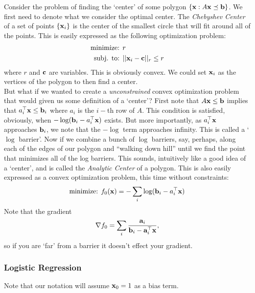 \documentclass{article}
\begin{document}
Consider the problem of finding the `center' of some
polygon $\{{\bf x} : A{\bf x} \preceq {\bf b}\}$. We first need to denote
what we consider the optimal center. The \textit{Chebyshev Center}
of a set of points $\{{\bf x}_i\}$ is the center of the smallest
circle that will fit around all of the points. This is easily
expressed as the following optimization problem:
\begin{align*}
    \text{minimize: } & r\\
    \text{subj. to: } & ||{\bf x}_i - {\bf c}||_r \leq r\\
\end{align*}
where $r$ and ${\bf c}$ are variables. This is obviously convex.
We could set ${\bf x}_i$ as the vertices of the polygon to then find a
center.\\

But what if we wanted to create
a \textit{unconstrained} convex optimization problem that would
given us some definition of a `center'? First note that $A{\bf x} \leq {\bf b}$
implies that $a_i^\top{\bf x} \leq {\bf b}_i$ where $a_i$ is the $i-$th row
of $A$. This condition is satisfied, obviously, when $-\log ({\bf b}_i - a_i^\top{\bf x})$
exists. But more importantly, as $a_i^\top{\bf x}$ approaches ${\bf b}_i$, we
note that the $-\log$ term approaches infinity. This is called a
`$\log$ barrier'. Now if we combine a bunch of $\log$ barriers, say,
perhaps, along each of the edges of our polygon and ``walking down
hill'' until we find the point that minimizes all of the log barriers. This
sounds, intuitively like a good idea of a `center', and is called the
\textit{Analytic Center} of a polygon. This is also easily expressed as
a convex optimization problem, this time without constraints:
\begin{align*}
    \text{minimize: } f_0({\bf x}) = -\sum_{i}\log({\bf b}_i - a_i^\top{\bf x})\\
\end{align*}
Note that the gradient
\[
    \nabla f_0 = \sum_i\frac{{\bf a}_i}{{\bf b}_i - {\bf a}_i^\top{\bf x}},
\]
so if you are `far' from a barrier it doesn't effect your gradient.

\subsubsection{Logistic Regression}

Note that our notation will assume ${\bf x}_0=1$ as a bias term.\\
\end{document}
